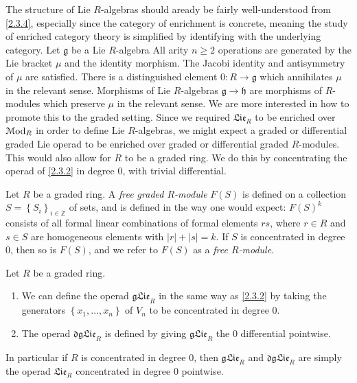 \begin{discussion}\label{2.3.5}
	The structure of Lie $R$-algebras should aready be fairly well-understood from \cref{2.3.4}, especially since the category of enrichment is concrete, meaning the study of enriched category theory is simplified by identifying with the underlying category. Let $\mathfrak{g} $ be a Lie $R$-algebra All arity $n\geq 2$ operations are generated by the Lie bracket $\mu $ and the identity morphism. The Jacobi identity and antisymmetry of $\mu $ are satisfied. There is a distinguished element $0: R \to \mathfrak{g} $ which annihilates $\mu $ in the relevant sense. Morphisms of Lie $R$-algebras $\mathfrak{g} \to \mathfrak{h} $ are morphisms of $R$-modules which preserve $\mu $ in the relevant sense. We are more interested in how to promote this to the graded setting. Since we required $\mathfrak{Lie}_R$ to be enriched over $\mathcal{M}\mathrm{od} _R$ in order to define Lie $R$-algebras, we might expect a graded or differential graded Lie operad to be enriched over graded or differential graded $R$-modules. This would also allow for $R$ to be a graded ring. We do this by concentrating the operad of \cref{2.3.2} in degree 0, with trivial differential.
\end{discussion}

\begin{definition}\label{2.3.6}
	Let $R$ be a graded ring. A \emph{free graded $R$-module} $F(S)$ is defined on a collection $S=\left\{ S_i \right\}_{i\in\mathbb{Z} } $ of sets, and is defined in the way one would expect: $F(S)^k$ consists of all formal linear combinations of formal elements $rs$, where $r\in R$ and $s\in S$ are homogeneous elements with $\left| r \right| +\left| s \right| =k$. If $S$ is concentrated in degree 0, then so is $F(S)$, and we refer to $F(S)$ as a \emph{free $R$-module}.
\end{definition}

\begin{definition}\label{2.3.7}
	Let $R$ be a graded ring.
	\begin{enumerate}[align=left, label=(\arabic*)]
		\item We can define the operad $\mathfrak{gLie}_R$ in the same way as \cref{2.3.2} by taking the generators $\left\{ x_1, \ldots ,x_n \right\} $ of $V_n$ to be concentrated in degree 0.
		\item The operad $\mathfrak{dgLie}_R$ is defined by giving $\mathfrak{gLie}_R$ the 0 differential pointwise.
	\end{enumerate}
	In particular if $R$ is concentrated in degree 0, then $\mathfrak{gLie} _R$ and $\mathfrak{dgLie} _R$ are simply the operad $\mathfrak{Lie} _R$ concentrated in degree 0 pointwise.
\end{definition}

